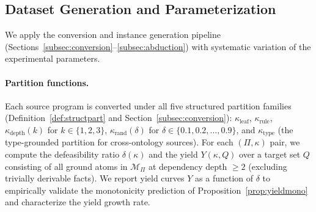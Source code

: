 \documentclass{article}
\theoremstyle{definition}
\newcommand{\partfunc}{\kappa}
\begin{document}
\subsection{Dataset Generation and Parameterization}\label{subsec:generation}

We apply the conversion and instance generation pipeline (Sections~\ref{subsec:conversion}--\ref{subsec:abduction}) with systematic variation of the experimental parameters.

\paragraph{Partition functions.} Each source program is converted under all five structured partition families (Definition~\ref{def:structpart} and Section~\ref{subsec:conversion}): $\partfunc_{\mathrm{leaf}}$, $\partfunc_{\mathrm{rule}}$, $\partfunc_{\mathrm{depth}}(k)$ for $k \in \{1, 2, 3\}$, $\partfunc_{\mathrm{rand}}(\delta)$ for $\delta \in \{0.1, 0.2, \ldots, 0.9\}$, and $\partfunc_{\mathrm{type}}$ (the type-grounded partition for cross-ontology sources). For each $(\Pi, \partfunc)$ pair, we compute the defeasibility ratio $\delta(\partfunc)$ and the yield $Y(\partfunc, Q)$ over a target set $Q$ consisting of all ground atoms in $\mathcal{M}_\Pi$ at dependency depth $\geq 2$ (excluding trivially derivable facts). We report yield curves $Y$ as a function of $\delta$ to empirically validate the monotonicity prediction of Proposition~\ref{prop:yieldmono} and characterize the yield growth rate.
\end{document}
